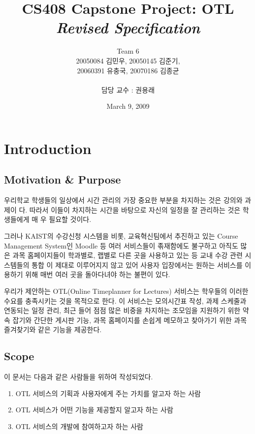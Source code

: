 \documentclass[a4paper,titlepage]{article}
\title{\textbf{CS408 Capstone Project: OTL}\\ \textit{Revised Specification}}
\author{Team 6\\20050084 김민우, 20050145 김준기,\\20060391 유충국, 20070186 김종균\\\\담당 교수 : 권용래}
\begin{document}
\date{March 9, 2009}
\maketitle

\tableofcontents
\listoffigures

\pagebreak

\section{Introduction}
\subsection{Motivation \& Purpose}
우리학교 학생들의 일상에서 시간 관리의 가장 중요한 부분을 차지하는 것은 강의와 과제이 
다. 따라서 이들이 차지하는 시간을 바탕으로 자신의 일정을 잘 관리하는 것은 학생들에게 매 
우 필요할 것이다. 

그러나 KAIST의 수강신청 시스템을 비롯, 교육혁신팀에서 추진하고 있는 Course Management System인 Moodle 등 여러 서비스들이 졲재함에도 불구하고 아직도 많은 과목 
홈페이지들이 학과별로, 랩별로 다른 곳을 사용하고 있는 등 교내 수강 관련 시스템들의 통합 이 제대로 이루어지지 않고 있어 사용자 입장에서는 원하는 서비스를 이용하기 위해 매번 여러 곳을 돌아다녀야 하는 불편이 있다. 

우리가 제안하는 OTL(Online Timeplanner for Lectures) 서비스는 학우들의 이러한 수요를 충족시키는 것을 목적으로 한다.
이 서비스는 모의시간표 작성, 과제 스케줄과 연동되는 일정 관리, 최근 들어 점점 많은 비중을 차지하는 조모임을 지원하기 위한 약속 잡기와 간단한 게시판 기능, 과목 홈페이지를 손쉽게 메모하고 찾아가기 위한 과목 즐겨찾기와 같은 기능을 제공한다.

\subsection{Scope}
이 문서는 다음과 같은 사람들을 위하여 작성되었다.
\begin{enumerate}
	\item OTL 서비스의 기획과 사용자에게 주는 가치를 알고자 하는 사람
	\item OTL 서비스가 어떤 기능을 제공할지 알고자 하는 사람
	\item OTL 서비스의 개발에 참여하고자 하는 사람
\end{enumerate}
\end{document}
